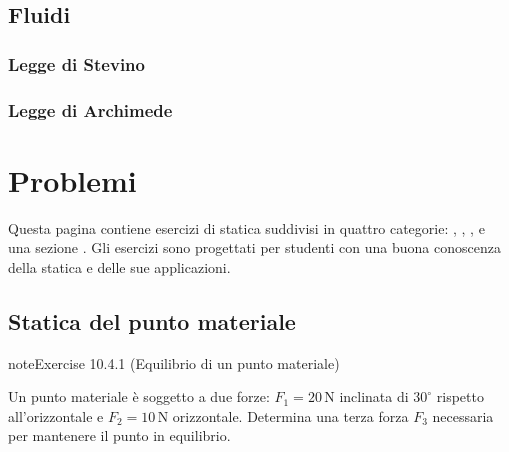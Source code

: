 \documentclass[letterpaper,10pt,italian]{jupyterBook}
\begin{document}
\subsection{Fluidi}
\label{\detokenize{ch/mechanics/statics-fluid:fluidi}}\label{\detokenize{ch/mechanics/statics-fluid:physics-hs-mechanics-statics-fluid-fluid}}

\subsubsection{Legge di Stevino}
\label{\detokenize{ch/mechanics/statics-fluid:legge-di-stevino}}\label{\detokenize{ch/mechanics/statics-fluid:physics-hs-mechanics-statics-fluid-stevino}}

\subsubsection{Legge di Archimede}
\label{\detokenize{ch/mechanics/statics-fluid:legge-di-archimede}}\label{\detokenize{ch/mechanics/statics-fluid:physics-hs-mechanics-statics-fluid-archimede}}
\sphinxstepscope


\section{Problemi}
\label{\detokenize{ch/mechanics/statics-problems:problemi}}\label{\detokenize{ch/mechanics/statics-problems:physics-hs-mechanics-statics-problems}}\label{\detokenize{ch/mechanics/statics-problems::doc}}
\sphinxAtStartPar
Questa pagina contiene esercizi di statica suddivisi in quattro categorie: , , , e una sezione . Gli esercizi sono progettati per studenti con una buona conoscenza della statica e delle sue applicazioni.


\subsection{Statica del punto materiale}
\label{\detokenize{ch/mechanics/statics-problems:statica-del-punto-materiale}} \label{exercise:ch/mechanics/statics-problems-exercise-0}

\begin{sphinxadmonition}{note}{Exercise 10.4.1 (Equilibrio di un punto materiale)}



\sphinxAtStartPar
Un punto materiale è soggetto a due forze: \(F_1 = 20 \, \text{N}\) inclinata di \(30^\circ\) rispetto all’orizzontale e \(F_2 = 10 \, \text{N}\) orizzontale. Determina una terza forza \(F_3\) necessaria per mantenere il punto in equilibrio.
\end{sphinxadmonition}
 \label{exercise:ch/mechanics/statics-problems-exercise-1}
\end{document}
